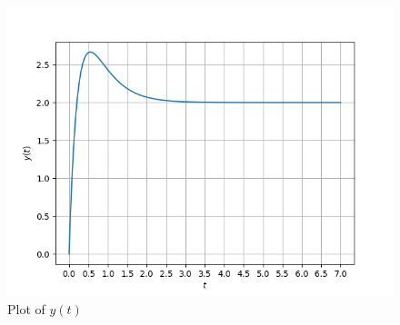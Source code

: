 \documentclass[journal,12pt,twocolumn]{IEEEtran}
\theoremstyle{remark}
\begin{document}
\begin{figure}[htbp]
	\includegraphics[width=\columnwidth]{2022/CH/60/figs/plot.png}
	\caption{Plot of $y(t)$}
	\label{fig:plot_ch60}
\end{figure}
\end{document}
